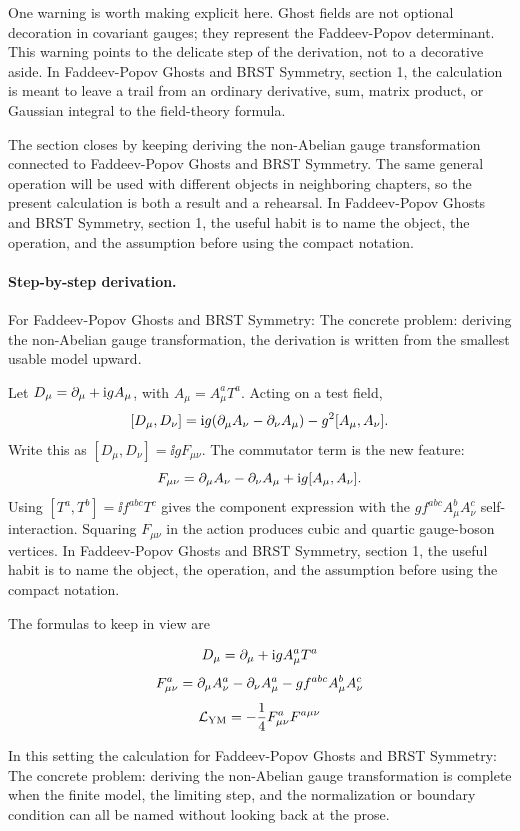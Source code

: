 One warning is worth making explicit here.  Ghost fields are not optional decoration in covariant gauges; they represent the Faddeev-Popov determinant.  This warning points to the delicate step of the derivation, not to a decorative aside.  In Faddeev-Popov Ghosts and BRST Symmetry, section 1, the calculation is meant to leave a trail from an ordinary derivative, sum, matrix product, or Gaussian integral to the field-theory formula.

The section closes by keeping deriving the non-Abelian gauge transformation connected to Faddeev-Popov Ghosts and BRST Symmetry.  The same general operation will be used with different objects in neighboring chapters, so the present calculation is both a result and a rehearsal.  In Faddeev-Popov Ghosts and BRST Symmetry, section 1, the useful habit is to name the object, the operation, and the assumption before using the compact notation.



\paragraph{Step-by-step derivation.}

For Faddeev-Popov Ghosts and BRST Symmetry: The concrete problem: deriving the non-Abelian gauge transformation, the derivation is written from the smallest usable model upward.

Let \(D_\mu=\partial_\mu+\mathrm i gA_\mu\), with \(A_\mu=A_\mu^aT^a\).  Acting on a test field,
\[
  [D_\mu,D_\nu]
  =
  \mathrm i g(\partial_\mu A_\nu-\partial_\nu A_\mu)-g^2[A_\mu,A_\nu].
\]
Write this as \([D_\mu,D_\nu]=\ii gF_{\mu\nu}\).  The commutator term is the new feature:
\[
  F_{\mu\nu}=\partial_\mu A_\nu-\partial_\nu A_\mu+\mathrm i g[A_\mu,A_\nu].
\]
Using \([T^a,T^b]=\ii f^{abc}T^c\) gives the component expression with the \(gf^{abc}A_\mu^bA_\nu^c\) self-interaction.  Squaring \(F_{\mu\nu}\) in the action produces cubic and quartic gauge-boson vertices.  In Faddeev-Popov Ghosts and BRST Symmetry, section 1, the useful habit is to name the object, the operation, and the assumption before using the compact notation.

The formulas to keep in view are

\[
  D_\mu=\partial_\mu+\mathrm i gA_\mu^aT^a
\]
\[
  F_{\mu\nu}^a=\partial_\mu A_\nu^a-\partial_\nu A_\mu^a-gf^{abc}A_\mu^bA_\nu^c
\]
\[
  \mathcal L_{\mathrm{YM}}=-\frac14F_{\mu\nu}^aF^{a\mu\nu}
\]

In this setting the calculation for Faddeev-Popov Ghosts and BRST Symmetry: The concrete problem: deriving the non-Abelian gauge transformation is complete when the finite model, the limiting step, and the normalization or boundary condition can all be named without looking back at the prose.




